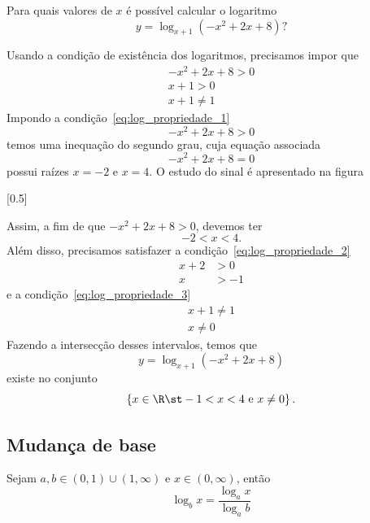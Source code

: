 \begin{example}
  Para quais valores de $x$ é possível calcular o logaritmo
  \[
    y = \log_{x+1} \left( -x^2 + 2x + 8 \right)?
  \]

  \solution
  Usando a condição de existência dos logaritmos,
  precisamos impor que
  \begin{gather}
    -x^2 + 2x + 8 > 0 \label{eq:ex_cond_log_1} \\
    x + 1 > 0         \label{eq:ex_cond_log_2} \\
    x + 1 \neq 1      \label{eq:ex_cond_log_3}
  \end{gather}
  Impondo a condição~\eqref{eq:log_propriedade_1}
  \[
    -x^2 + 2x + 8 > 0
  \]
  temos uma inequação do segundo grau, cuja equação associada
  \[
    -x^2 + 2x + 8 = 0
  \]
  possui raízes $x=-2$ e $x=4$.
  O estudo do sinal é apresentado na figura

  [0.5]

  Assim, a fim de que $-x^2+2x+8>0$, devemos ter
  \[
    -2 < x < 4.
  \]
  Além disso, precisamos satisfazer a condição~\eqref{eq:log_propriedade_2}
  \begin{align*}
    x + 2 & > 0 \\
    x     & > -1
  \end{align*}
  e a condição~\eqref{eq:log_propriedade_3}
  \begin{align*}
    x + 1 \neq 1 \\
    x \neq 0
  \end{align*}
  Fazendo a intersecção desses intervalos, temos que
  \[
    y = \log_{x+1}\left(-x^2+2x+8\right)
  \]
  existe no conjunto
  \[
    \left\{ x \in \R \st -1<x<4 \text{ e } x \neq 0 \right\}.
  \]
\end{example}

\subsection{Mudança de base}

Sejam $a, b \in (0, 1)\cup(1, \infty)$ e $x\in(0, \infty)$, então
\begin{equation}
  \label{eq:log_mudanca_base}
  \log_{b} x=\frac{\log_a x}{\log_a b}
\end{equation}

